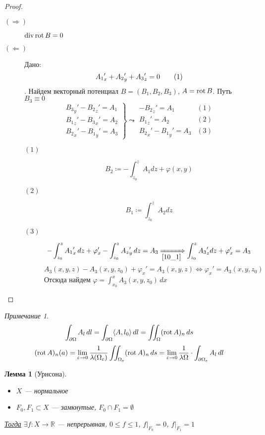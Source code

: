 \documentclass[english]{article}
\newcommand\addtag{\refstepcounter{equation}\tag{\theequation}}
\newcommand{\R}{\mathbb{R}}
\theoremstyle{plain}
\newtheorem{lemma}{Лемма}
\theoremstyle{remark}
\newtheorem*{remark}{Примечание}
\theoremstyle{definition}
\begin{document}
\begin{proof}
\-
\begin{description}
\item[{\((\Rightarrow)\)}] \(\mathop{\rm div} \mathop{\rm rot}\nolimits B = 0\)
\item[{\((\Leftarrow)\)}] Дано: \[{A_1}_x' + {A_2}_y' + {A_3}_z' = 0 \addtag\label{10_1}\]. Найдем векторный потенциал \(B = (B_1, B_2, B_3)\), \(A = \mathop{\rm rot}\nolimits B\). Путь \(B_3 \equiv 0\)
\[ \left.\begin{array}{l}
  {B_3}_y' - {B_2}_z' = A_1 \\
  {B_1}_z' - {B_3}_x' = A_2 \\
  {B_2}_x' - {B_1}_y' = A_3
  \end{array}\right\} \leadsto \begin{array}{rl}
  -{B_2}_z' = A_1 & (1)\\
  {B_1}_z'  = A_2 & (2) \\
  {B_2}_x' - {B_1}_y' = A_3 & (3)
  \end{array}\]
\begin{description}
\item[{\((1)\)}] \[ B_2 \coloneqq - \int_{z_0}^z A_1 dz + \varphi(x, y) \]
\item[{\((2)\)}] \[ B_1 \coloneqq \int_{z_0}^z A_2 dz \]
\item[{\((3)\)}] \[ -\int_{z_0}^z {A_1}'_x\,dz + \varphi'_x - \int_{z_0}^z {A_z}'_y\,dz = A_3 \xRightarrow[\ref{10_1}]{} \int_{z_0}^z {A_3}_z' dz + \varphi_x' = A_3 \]
\[ A_3(x, y, z) - A_3(x, y, z_0) + \varphi_x' = A_3(x, y, z) \Leftrightarrow \varphi_x' = A_3(x, y, z_0) \]
Отсюда найдем \(\varphi = \int_{x_0}^x A_3(x,y,z_0)\,dx\)
\end{description}
\end{description}
\end{proof}
\begin{remark}
\[ \int_{\partial \Omega} A_l\,dl = \int_{\partial \Omega} \langle A, l_0 \rangle \,dl = \iint_{\Omega} (\mathop{\rm rot}\nolimits A)_n \,ds \]
\[ (\mathop{\rm rot}\nolimits A)_n(a) = \lim_{\varepsilon \to 0} \frac{1}{\lambda(\Omega_\varepsilon)} \iint_{\Omega_\varepsilon} (\mathop{\rm rot}\nolimits A)_n\,ds = \lim_{\varepsilon \to 0}\frac{1}{\lambda \Omega} \cdot \int_{\partial \Omega_\varepsilon} A_l\,dl \]
\end{remark}
\begin{lemma}[Урнсона]
\-
\begin{itemize}
\item \(X\) --- нормальное
\item \(F_0, F_1 \subset X\) --- замкнутые, \(F_0 \cap F_1 = \emptyset\)
\end{itemize}
\uline{Тогда} \(\exists f: X \to \R\) --- непрерывная, \(0 \le f \le 1\), \(f\big|_{F_0} = 0\), \(f\big|_{F_1} = 1\)
\end{lemma}
\end{document}
